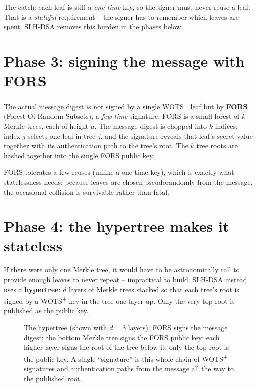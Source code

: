 The catch: each leaf is still a \emph{one-time} key, so the signer must never reuse a leaf. That is a \emph{stateful} requirement -- the signer has to remember which leaves are spent. SLH-DSA removes this burden in the phases below.

\section{Phase 3: signing the message with FORS}

The actual message digest is not signed by a single WOTS\textsuperscript{+} leaf but by \textbf{FORS} (Forest Of Random Subsets), a \emph{few-time} signature. FORS is a small forest of $k$ Merkle trees, each of height $a$. The message digest is chopped into $k$ indices; index $j$ selects one leaf in tree $j$, and the signature reveals that leaf's secret value together with its authentication path to the tree's root. The $k$ tree roots are hashed together into the single FORS public key.

FORS tolerates a few reuses (unlike a one-time key), which is exactly what statelessness needs: because leaves are chosen pseudorandomly from the message, the occasional collision is survivable rather than fatal.

\section{Phase 4: the hypertree makes it stateless}

If there were only one Merkle tree, it would have to be astronomically tall to provide enough leaves to never repeat -- impractical to build. SLH-DSA instead uses a \textbf{hypertree}: $d$ layers of Merkle trees stacked so that each tree's root is signed by a WOTS\textsuperscript{+} key in the tree one layer up. Only the very top root is published as the public key.

\begin{figure}[H]
\centering
{}
\caption{The hypertree (shown with $d=3$ layers). FORS signs the message digest; the bottom Merkle tree signs the FORS public key; each higher layer signs the root of the tree below it; only the top root is the public key. A single ``signature'' is this whole chain of WOTS\textsuperscript{+} signatures and authentication paths from the message all the way to the published root.}
\label{fig:hypertree}
\end{figure}

